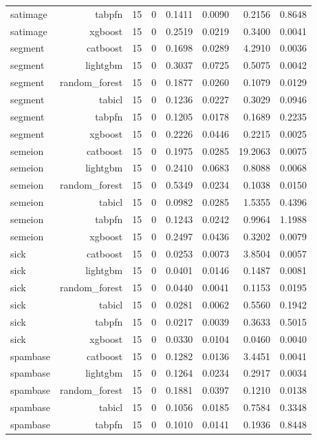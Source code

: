 \begin{table}[htbp]
\begin{tabular}{lrrrrrrr}
satimage & tabpfn & 15 & 0 & 0.1411 & 0.0090 & 0.2156 & 0.8648 \\
satimage & xgboost & 15 & 0 & 0.2519 & 0.0219 & 0.3400 & 0.0041 \\
segment & catboost & 15 & 0 & 0.1698 & 0.0289 & 4.2910 & 0.0036 \\
segment & lightgbm & 15 & 0 & 0.3037 & 0.0725 & 0.5075 & 0.0042 \\
segment & random\_forest & 15 & 0 & 0.1877 & 0.0260 & 0.1079 & 0.0129 \\
segment & tabicl & 15 & 0 & 0.1236 & 0.0227 & 0.3029 & 0.0946 \\
segment & tabpfn & 15 & 0 & 0.1205 & 0.0178 & 0.1689 & 0.2235 \\
segment & xgboost & 15 & 0 & 0.2226 & 0.0446 & 0.2215 & 0.0025 \\
semeion & catboost & 15 & 0 & 0.1975 & 0.0285 & 19.2063 & 0.0075 \\
semeion & lightgbm & 15 & 0 & 0.2410 & 0.0683 & 0.8088 & 0.0068 \\
semeion & random\_forest & 15 & 0 & 0.5349 & 0.0234 & 0.1038 & 0.0150 \\
semeion & tabicl & 15 & 0 & 0.0982 & 0.0285 & 1.5355 & 0.4396 \\
semeion & tabpfn & 15 & 0 & 0.1243 & 0.0242 & 0.9964 & 1.1988 \\
semeion & xgboost & 15 & 0 & 0.2497 & 0.0436 & 0.3202 & 0.0079 \\
sick & catboost & 15 & 0 & 0.0253 & 0.0073 & 3.8504 & 0.0057 \\
sick & lightgbm & 15 & 0 & 0.0401 & 0.0146 & 0.1487 & 0.0081 \\
sick & random\_forest & 15 & 0 & 0.0440 & 0.0041 & 0.1153 & 0.0195 \\
sick & tabicl & 15 & 0 & 0.0281 & 0.0062 & 0.5560 & 0.1942 \\
sick & tabpfn & 15 & 0 & 0.0217 & 0.0039 & 0.3633 & 0.5015 \\
sick & xgboost & 15 & 0 & 0.0330 & 0.0104 & 0.0460 & 0.0040 \\
spambase & catboost & 15 & 0 & 0.1282 & 0.0136 & 3.4451 & 0.0041 \\
spambase & lightgbm & 15 & 0 & 0.1264 & 0.0234 & 0.2917 & 0.0034 \\
spambase & random\_forest & 15 & 0 & 0.1881 & 0.0397 & 0.1210 & 0.0138 \\
spambase & tabicl & 15 & 0 & 0.1056 & 0.0185 & 0.7584 & 0.3348 \\
spambase & tabpfn & 15 & 0 & 0.1010 & 0.0141 & 0.1936 & 0.8448 \\

\end{tabular}
\end{table}
